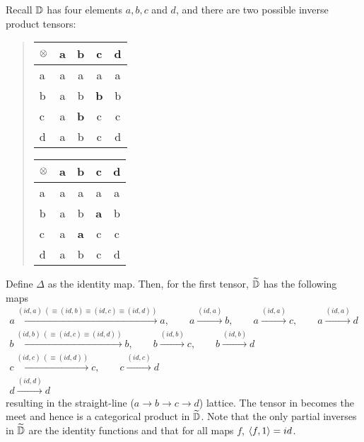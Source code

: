 Recall $\mathbb{D}$ has four elements $a,b,c$ and $d$, and there are two possible inverse product tensors:
\begin{quote}\qquad\qquad
  \begin{tabular}{|l||c|c|c|c|} 
    \hline
    $\otimes$&a&b&c&d\\ \hline \hline
    a&a&a&a&a\\ \hline
    b&a&b&\textbf{b}&b\\ \hline
    c&a&\textbf{b}&c&c \\ \hline
    d&a&b&c&d \\ \hline
  \end{tabular}
  \hfil
  \begin{tabular}{|l||c|c|c|c|} \hline
    $\otimes$&a&b&c&d\\ \hline \hline
    a&a&a&a&a\\ \hline
    b&a&b&\textbf{a}&b\\ \hline
    c&a&\textbf{a}&c&c \\ \hline
    d&a&b&c&d \\ \hline
  \end{tabular}
  \qquad \qquad
\end{quote}


Define $\Delta$ as the identity map. Then, for the first tensor, $\widetilde{\mathbb{D}}$ has the following
maps
\begin{align*}
  a \xrightarrow{(id,a)\ (\equiv (id, b) \equiv (id,c) \equiv (id,d))} a, \qquad a
    \xrightarrow{(id,a)} b, \qquad a \xrightarrow{(id, a)} c , \qquad a \xrightarrow{(id, a)} d \\
  b \xrightarrow{(id,b) \ (\equiv (id, c) \equiv (id, d))} b , \qquad b \xrightarrow{(id,b)} c,
    \qquad b \xrightarrow{(id,b)} d\\
  c \xrightarrow{(id, c) \ (\equiv (id, d))} c ,   \qquad c \xrightarrow{(id,c)} d\\
  d \xrightarrow{(id,d)} d
\end{align*}
resulting in the straight-line ($a \to b \to c \to d$) lattice. The tensor in \D becomes the meet
and hence is a categorical product in $\widetilde{\mathbb{D}}$. Note that the only partial inverses in
$\widetilde{\mathbb{D}}$ are the identity functions and that for all maps $f$, $\langle f,1\rangle = id$.

